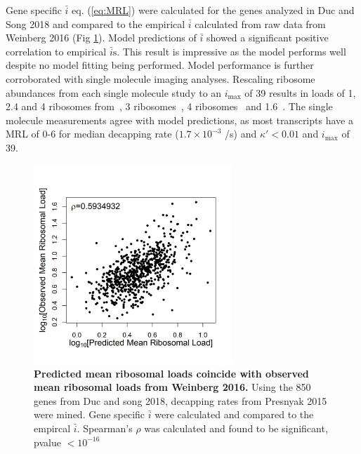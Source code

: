 \documentclass[10pt,letterpaper]{article}
\newcommand{\imax}{\ensuremath{{i_{\max}}}\xspace}
\newcommand{\MRL}{\ensuremath{\bar{i}}\xspace}
\newcommand{\MRLs}{\ensuremath{\bar{i}\text{s}}\xspace}
\begin{document}
Gene specific \MRL eq. (\ref{eq:MRL}) were calculated for the genes analyzed in Duc and Song 2018 and compared to the empirical \MRL calculated from raw data from Weinberg 2016 (Fig \ref{fig11}).
Model predictions of \MRL showed a significant positive correlation to empirical \MRLs.
This result is impressive as the model performs well despite no model fitting being performed.
Model performance is further corroborated with single molecule imaging analyses.
Rescaling ribosome abundances from each single molecule study to an \imax of 39 results in loads of 1, 2.4 and 4 ribosomes from~\cite{RN30}, 3 ribosomes~\cite{RN31}, 4 ribosomes~\cite{RN32} and 1.6~\cite{RN33}.
The single molecule measurements agree with model predictions, as most transcripts have a MRL of 0-6 for median decapping rate ($1.7\times 10^{-3}$ /s) and  $\kappa' < 0.01$ and \imax of 39.



\begin{figure}[!h]
\begin{center}
\centering
\includegraphics[width=75mm]{Images/Duc_Song_vs_model_log.png}
\caption{{\bf Predicted mean ribosomal loads coincide with observed mean ribosomal loads from Weinberg 2016.}
Using the 850 genes from Duc and song 2018, decapping rates from Presnyak 2015 were mined. Gene specific \MRL were calculated and compared to the empircal \MRL. Spearman's $\rho$ was calculated and found to be significant, pvalue $<10^{-16}$}
\label{fig11}
\end{center}
\end{figure}
\end{document}
